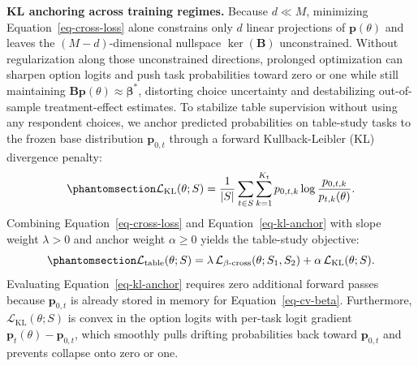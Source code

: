 \documentclass[
  11pt,
  letterpaper,
]{article}
\begin{document}
\textbf{KL anchoring across training regimes.} Because \(d \ll M\),
minimizing Equation~\ref{eq-cross-loss} alone constrains only \(d\)
linear projections of \(\mathbf{p}(\theta)\) and leaves the
\((M - d)\)-dimensional nullspace \(\ker(\mathbf{B})\) unconstrained.
Without regularization along those unconstrained directions, prolonged
optimization can sharpen option logits and push task probabilities
toward zero or one while still maintaining
\(\mathbf{B}\mathbf{p}(\theta) \approx \boldsymbol{\beta}^*\),
distorting choice uncertainty and destabilizing out-of-sample
treatment-effect estimates. To stabilize table supervision without using
any respondent choices, we anchor predicted probabilities on table-study
tasks to the frozen base distribution \(\mathbf{p}_{0,t}\) through a
forward Kullback-Leibler (KL) divergence penalty:
\begin{equation}\protect\phantomsection\label{eq-kl-anchor}{
\mathcal{L}_{\mathrm{KL}}(\theta; S) = \frac{1}{|S|} \sum_{t \in S} \sum_{k=1}^{K_t} p_{0,t,k} \log \frac{p_{0,t,k}}{p_{t,k}(\theta)}.
}\end{equation} Combining Equation~\ref{eq-cross-loss} and
Equation~\ref{eq-kl-anchor} with slope weight \(\lambda > 0\) and anchor
weight \(\alpha \ge 0\) yields the table-study objective:
\begin{equation}\protect\phantomsection\label{eq-table-loss}{
\mathcal{L}_{\mathrm{table}}(\theta; S) = \lambda \, \mathcal{L}_{\beta\text{-cross}}(\theta; S_1, S_2) + \alpha \, \mathcal{L}_{\mathrm{KL}}(\theta; S).
}\end{equation} Evaluating Equation~\ref{eq-kl-anchor} requires zero
additional forward passes because \(\mathbf{p}_{0,t}\) is already stored
in memory for Equation~\ref{eq-cv-beta}. Furthermore,
\(\mathcal{L}_{\mathrm{KL}}(\theta; S)\) is convex in the option logits
with per-task logit gradient
\(\mathbf{p}_t(\theta) - \mathbf{p}_{0,t}\), which smoothly pulls
drifting probabilities back toward \(\mathbf{p}_{0,t}\) and prevents
collapse onto zero or one.
\end{document}
